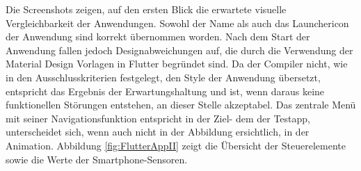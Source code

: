 Die Screenshots zeigen,  auf den ersten Blick die erwartete visuelle Vergleichbarkeit der Anwendungen.  Sowohl der Name als auch das Launchericon der Anwendung sind korrekt übernommen worden.  Nach dem Start der Anwendung fallen jedoch Designabweichungen auf, die durch die Verwendung der Material Design Vorlagen in Flutter begründet sind. Da der Compiler nicht,  wie in den Ausschlusskriterien festgelegt, den Style der Anwendung übersetzt,  entspricht das Ergebnis der Erwartungshaltung und ist, wenn daraus keine funktionellen Störungen 
entstehen,  an dieser Stelle akzeptabel.  Das zentrale Menü mit seiner Navigationsfunktion entspricht in der Ziel- dem der Testapp,  
unterscheidet sich, wenn auch nicht in der Abbildung ersichtlich,  in der Animation.  Abbildung \ref{fig:FlutterAppII} zeigt die Übersicht der Steuerelemente sowie die Werte der Smartphone-Sensoren.

